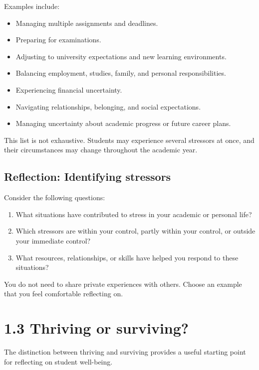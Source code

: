 \documentclass[
  letterpaper,
]{book}
\providecommand{\tightlist}{%
  \setlength{\itemsep}{0pt}\setlength{\parskip}{0pt}}
\begin{document}
Examples include:

\begin{itemize}
\tightlist
\item
  Managing multiple assignments and deadlines.
\item
  Preparing for examinations.
\item
  Adjusting to university expectations and new learning environments.
\item
  Balancing employment, studies, family, and personal responsibilities.
\item
  Experiencing financial uncertainty.
\item
  Navigating relationships, belonging, and social expectations.
\item
  Managing uncertainty about academic progress or future career plans.
\end{itemize}

This list is not exhaustive. Students may experience several stressors
at once, and their circumstances may change throughout the academic
year.

\subsection{Reflection: Identifying
stressors}\label{reflection-identifying-stressors}

Consider the following questions:

\begin{enumerate}
\def\labelenumi{\arabic{enumi}.}
\tightlist
\item
  What situations have contributed to stress in your academic or
  personal life?
\item
  Which stressors are within your control, partly within your control,
  or outside your immediate control?
\item
  What resources, relationships, or skills have helped you respond to
  these situations?
\end{enumerate}

You do not need to share private experiences with others. Choose an
example that you feel comfortable reflecting on.

\section{1.3 Thriving or surviving?}\label{thriving-or-surviving}

The distinction between thriving and surviving provides a useful
starting point for reflecting on student well-being.
\end{document}
